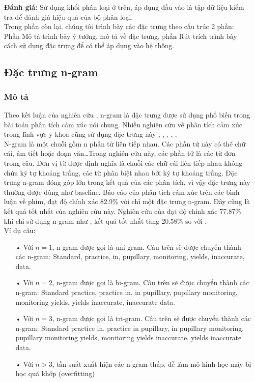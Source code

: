 \textbf{Đánh giá:} Sử dụng khối phân loại ở trên, áp dụng đầu vào là tập dữ liệu kiểm tra để đánh giá hiệu quả của bộ phân loại.\\

Trong phần còn lại, chúng tôi trình bày các đặc trưng theo cấu trúc 2 phần: Phần Mô tả trình bày ý tưởng, mô tả về đặc trưng, phần Rút trích trình bày cách sử dụng đặc trưng để có thể áp dụng vào hệ thống.


\subsection{Đặc trưng n-gram} \label{sec:ngram}
\subsubsection*{Mô tả}
Theo kết luận của nghiên cứu \cite{chandrakala2012opinion}, n-gram là đặc trưng được sử dụng phổ biến trong bài toán phân tích cảm xúc nói chung. Nhiều nghiên cứu về phân tích cảm xúc trong lĩnh vực y khoa cũng sử dụng đặc trưng này \cite{pang2002thumbs}, \cite{niu2005analysis}, \cite{sarker2011outcome}, \cite{niu2006using}, \cite{pestian2012sentie}, \cite{xia09improving} \\

N-gram là một chuỗi gồm n phần tử liên tiếp nhau. Các phần tử này có thể chữ cái, âm tiết hoặc đoạn văn\ldots Trong nghiên cứu này, các phần tử là các từ đơn trong câu. Đơn vị từ được định nghĩa là chuỗi các chữ cái liên tiếp nhau không chứa ký tự khoảng trắng, các từ phân biệt nhau bởi ký tự khoảng trắng. Đặc trưng n-gram đóng góp lớn trong kết quả của các phân tích, vì vậy đặc trưng này thường được dùng như baseline. Báo cáo  của \cite{pang2002thumbs} phân tích cảm xúc trên các bình luận về phim, đạt độ chính xác 82.9\% với chỉ một đặc trưng n-gram. Đây cũng là kết quả tốt nhất của nghiên cứu này. Nghiên cứu của \cite{niu2005analysis} đạt độ chính xác 77.87\% khi chỉ sử dụng n-gram như , kết quả tốt nhất tăng 20.58\% so với .\\

Ví dụ câu: 
\begin{itemize}
\item[•]Với $n=1$, n-gram được gọi là uni-gram. Câu trên sẽ được chuyển thành các n-gram: Standard, practice, in, pupillary, monitoring, yields, inaccurate, data.
\item[•]Với $n=2$, n-gram được gọi là bi-gram. Câu trên sẽ được chuyển thành các n-gram: Standard practice, practice in, in pupillary, pupillary monitoring, monitoring yields, yields inaccurate, inaccurate data.
\item[•]Với $n=3$, n-gram được gọi là tri-gram. Câu trên sẽ được chuyển thành các n-gram: Standard practice in, practice in pupillary, in pupillary monitoring, pupillary monitoring yields, monitoring yields inaccurate, yields inaccurate data.
\item[•]Với $n>3$, tần suất xuất hiện các n-gram thấp, dễ làm mô hình học máy bị học quá khớp (overfitting)
\end{itemize}
	
